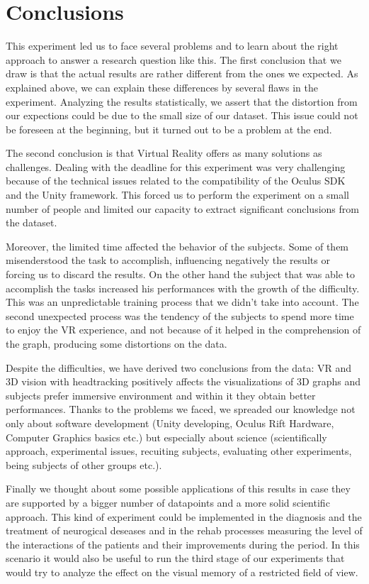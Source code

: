 \chapter{Conclusions}

This experiment led us to face several problems and to learn about the right
approach to answer a research question like this. The first conclusion that we
draw is that the actual results are rather different from the ones
we expected. As explained above, we can explain these differences by several flaws in the experiment.
Analyzing the results statistically, we assert that the distortion from
our expections could be due to the small size of our dataset. This issue
could not be foreseen at the beginning, but it turned out to be a
problem at the end.

The second conclusion is that Virtual Reality offers as many solutions
as challenges. Dealing with the deadline for this experiment was
very challenging because of the technical issues related to the
compatibility of the Oculus SDK and the Unity framework. This forced
us to perform the experiment on a small number of people and limited our
capacity to extract significant conclusions from the dataset.

Moreover, the limited time affected the behavior of the subjects. Some
of them misenderstood the task to accomplish, influencing negatively the
results or forcing us to discard the results. On the other hand the
subject that was able to accomplish the tasks increased his performances
with the growth of the difficulty. This was an unpredictable training
process that we didn't take into account. The second unexpected process
was the tendency of the subjects to spend more time to enjoy the VR
experience, and not because of it helped in the comprehension of the
graph, producing some distortions on the data.

Despite the difficulties, we have derived two conclusions from the data:
VR and 3D vision with headtracking positively affects the visualizations
of 3D graphs and subjects prefer immersive environment and within it
they obtain better performances. Thanks to the problems we faced, we
spreaded our knowledge not only about software development (Unity
developing, Oculus Rift Hardware, Computer Graphics basics etc.) but
especially about science (scientifically approach, experimental issues,
recuiting subjects, evaluating other experiments, being subjects of other
groups etc.).

Finally we thought about some possible applications of this results in
case they are supported by a bigger number of datapoints and a more solid
scientific approach. This kind of experiment could be implemented in the
diagnosis and the treatment of neurogical deseases and in the rehab
processes measuring the level of the interactions of the patients and
their improvements during the period. In this scenario it would also be
useful to run the third stage of our experiments that would try to analyze the
effect on the visual memory of a restricted field of view.





